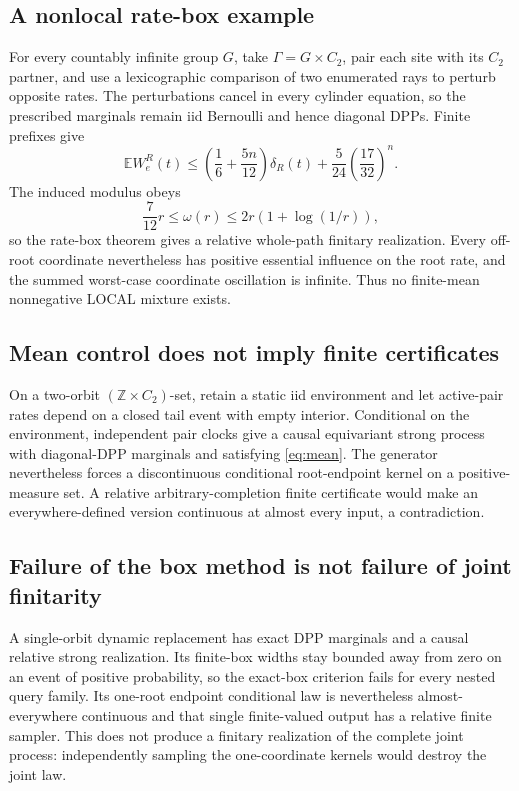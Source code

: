 \documentclass[11pt]{article}
\theoremstyle{definition}
\theoremstyle{remark}
\newcommand{\E}{\mathbb{E}}
\newcommand{\1}{\mathbf{1}}
\begin{document}
\subsection{A nonlocal rate-box example}

For every countably infinite group $G$, take $\Gamma=G\times C_2$, pair each
site with its $C_2$ partner, and use a lexicographic comparison of two
enumerated rays to perturb opposite rates.  The perturbations cancel in every
cylinder equation, so the prescribed marginals remain iid Bernoulli and hence
diagonal DPPs.  Finite prefixes give
\[
 \E W_e^R(t)
 \le\left(\frac16+\frac{5n}{12}\right)\delta_R(t)
 +\frac5{24}\left(\frac{17}{32}\right)^n.
\]
The induced modulus obeys
\[
 \frac{7}{12}r\le\omega(r)\le2r(1+\log(1/r)),
\]
so the rate-box theorem gives a relative whole-path finitary realization.
Every off-root coordinate nevertheless has positive essential influence on
the root rate, and the summed worst-case coordinate oscillation is infinite.
Thus no finite-mean nonnegative LOCAL mixture exists.

\subsection{Mean control does not imply finite certificates}

On a two-orbit $(\mathbb{Z}\times C_2)$-set, retain a static iid environment
and let active-pair rates depend on a closed tail event with empty interior.
Conditional on the environment, independent pair clocks give a causal
equivariant strong process with diagonal-DPP marginals and satisfying
\eqref{eq:mean}.  The generator nevertheless forces a discontinuous
conditional root-endpoint kernel on a positive-measure set.  A relative
arbitrary-completion finite certificate would make an everywhere-defined
version continuous at almost every input, a contradiction.

\subsection{Failure of the box method is not failure of joint finitarity}

A single-orbit dynamic replacement has exact DPP marginals and a causal
relative strong realization.  Its finite-box widths stay bounded away from
zero on an event of positive probability, so the exact-box criterion fails
for every nested query family.  Its one-root endpoint conditional law is
nevertheless almost-everywhere continuous and that single finite-valued
output has a relative finite sampler.  This does not produce a finitary
realization of the complete joint process: independently sampling the
one-coordinate kernels would destroy the joint law.
\end{document}

